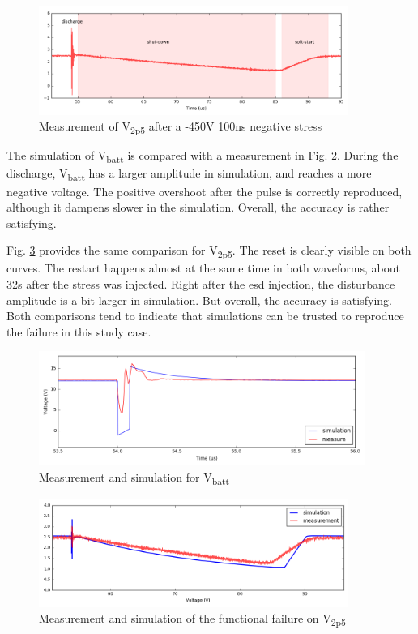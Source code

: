 \begin{figure}[!h]
  \centering
  \includegraphics[width=0.9\textwidth]{src/3/figures/v2p5_measure.png}
  \caption{Measurement of V\textsubscript{2p5} after a -450V 100ns negative stress}
  \label{fig:meas-reset-v2p5}
\end{figure}


The simulation of V\textsubscript{batt} is compared with a measurement in Fig. \ref{fig:wvf-vbatt}.
During the discharge, V\textsubscript{batt} has a larger amplitude in simulation, and reaches a more negative voltage.
The positive overshoot after the pulse is correctly reproduced, although it dampens slower in the simulation.
Overall, the accuracy is rather satisfying.

Fig. \ref{fig:wvf-v2p5} provides the same comparison for V\textsubscript{2p5}.
The reset is clearly visible on both curves.
The restart happens almost at the same time in both waveforms, about 32\textmu{}s after the stress was injected.
Right after the \gls{esd} injection, the disturbance amplitude is a bit larger in simulation.
But overall, the accuracy is satisfying.
Both comparisons tend to indicate that simulations can be trusted to reproduce the failure in this study case.

\begin{figure}[!h]
  \centering
  \includegraphics[width=0.95\textwidth]{src/3/figures/vbatt.png}
  \caption{Measurement and simulation for V\textsubscript{batt}}
  \label{fig:wvf-vbatt}
\end{figure}

\begin{figure}[!h]
  \centering
  \includegraphics[width=0.9\textwidth]{src/3/figures/v2p5.png}
  \caption{Measurement and simulation of the functional failure on V\textsubscript{2p5}}
  \label{fig:wvf-v2p5}
\end{figure}

